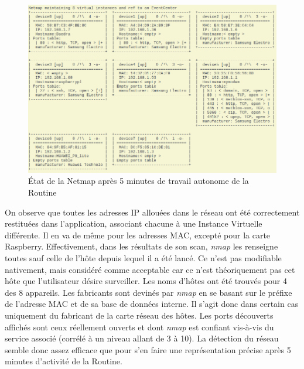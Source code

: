 \documentclass[]{article}
\begin{document}
\begin{figure}[!ht]
\centering
     \includegraphics[width=0.9\linewidth]{netmapDisc}
     \caption{État de la Netmap après 5 minutes de travail autonome de la Routine}
     \label{netmapdisc}
\end{figure}

\vspace{0.2cm}

On observe que toutes les adresses IP allouées dans le réseau ont été correctement restituées dans l'application, associant chacune à une Instance Virtuelle différente. Il en va de même pour les adresses MAC, excepté pour la carte Raspberry. Effectivement, dans les résultats de son scan, \textit{nmap} les renseigne toutes sauf celle de l'hôte depuis lequel il a été lancé. Ce n'est pas modifiable nativement, mais considéré comme acceptable car ce n'est théoriquement pas cet hôte que l'utilisateur désire surveiller. Les noms d'hôtes ont été trouvés pour 4 des 8 appareils. Les fabricants sont devinés par \textit{nmap} en se basant sur le préfixe de l'adresse MAC et de sa base de données interne. Il s'agit donc dans certain cas uniquement du fabricant de la carte réseau des hôtes. Les ports découverts affichés sont ceux réellement ouverts et dont \textit{nmap} est confiant vis-à-vis du service associé (corrélé à un niveau allant de 3 à 10). La détection du réseau semble donc assez efficace que pour s'en faire une représentation précise après 5 minutes d'activité de la Routine.

\newpage
\end{document}

